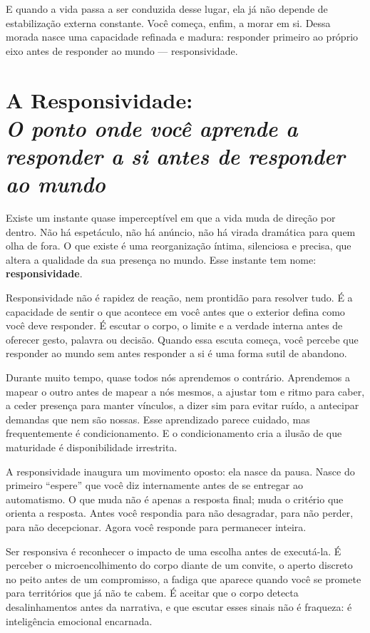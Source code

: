 \documentclass[12pt]{book}
\begin{document}
E quando a vida passa a ser conduzida desse lugar, ela já não depende de estabilização externa constante. Você começa, enfim, a morar em si. Dessa morada nasce uma capacidade refinada e madura: responder primeiro ao próprio eixo antes de responder ao mundo — responsividade.

\chapter[A Responsividade: O ponto onde você aprende a responder a si antes de responder ao mundo]{A Responsividade:\\[0.4ex]\large\itshape O ponto onde você aprende a responder a si antes de responder ao mundo}

Existe um instante quase imperceptível em que a vida muda de direção por dentro. Não há espetáculo, não há anúncio, não há virada dramática para quem olha de fora. O que existe é uma reorganização íntima, silenciosa e precisa, que altera a qualidade da sua presença no mundo. Esse instante tem nome: \textbf{responsividade}.

Responsividade não é rapidez de reação, nem prontidão para resolver tudo. É a capacidade de sentir o que acontece em você antes que o exterior defina como você deve responder. É escutar o corpo, o limite e a verdade interna antes de oferecer gesto, palavra ou decisão. Quando essa escuta começa, você percebe que responder ao mundo sem antes responder a si é uma forma sutil de abandono.

Durante muito tempo, quase todos nós aprendemos o contrário. Aprendemos a mapear o outro antes de mapear a nós mesmos, a ajustar tom e ritmo para caber, a ceder presença para manter vínculos, a dizer sim para evitar ruído, a antecipar demandas que nem são nossas. Esse aprendizado parece cuidado, mas frequentemente é condicionamento. E o condicionamento cria a ilusão de que maturidade é disponibilidade irrestrita.

A responsividade inaugura um movimento oposto: ela nasce da pausa. Nasce do primeiro “espere” que você diz internamente antes de se entregar ao automatismo. O que muda não é apenas a resposta final; muda o critério que orienta a resposta. Antes você respondia para não desagradar, para não perder, para não decepcionar. Agora você responde para permanecer inteira.

Ser responsiva é reconhecer o impacto de uma escolha antes de executá-la. É perceber o microencolhimento do corpo diante de um convite, o aperto discreto no peito antes de um compromisso, a fadiga que aparece quando você se promete para territórios que já não te cabem. É aceitar que o corpo detecta desalinhamentos antes da narrativa, e que escutar esses sinais não é fraqueza: é inteligência emocional encarnada.
\end{document}
